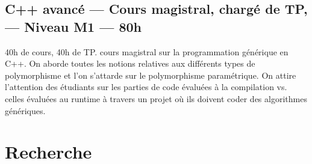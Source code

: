 \documentclass[11pt,a4paper,sans]{article} %
\begin{document}
\subsection{C++ avancé --- Cours magistral, chargé de TP, --- Niveau M1 --- 80h}

40h de cours, 40h de TP. cours magistral sur la programmation générique en C++. On aborde toutes les
notions relatives aux différents types de polymorphisme et l'on s'attarde sur le polymorphisme paramétrique. On attire
l'attention des étudiants sur les parties de code évaluées à la compilation vs. celles évaluées au runtime à travers un
projet où ils doivent coder des algorithmes génériques.

\clearpage

\section{Recherche}

\clearpage

\renewcommand{\refname}{Publications}
%
\printbibliography[heading=bibintoc]
\end{document}

